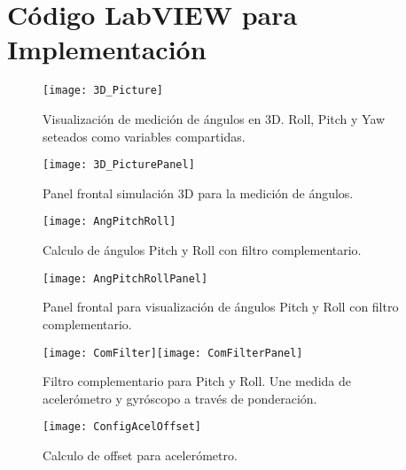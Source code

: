 \documentclass[\main/main.tex]{subfiles}
\begin{document}
\chapter{Código LabVIEW para Implementación}
\begin{landscape}

\begin{figure}
\begin{centering}
\texttt{[image: 3D\_Picture]}
\par\end{centering}
\caption{Visualización de medición de ángulos en 3D. Roll, Pitch y Yaw seteados
como variables compartidas.}
\end{figure}

\begin{figure}
\begin{centering}
\texttt{[image: 3D\_PicturePanel]}
\par\end{centering}
\caption{Panel frontal simulación 3D para la medición de ángulos.}
\end{figure}

\begin{figure}
\begin{centering}
\texttt{[image: AngPitchRoll]}
\par\end{centering}
\caption{Calculo de ángulos Pitch y Roll con filtro complementario.}
\end{figure}

\begin{figure}
\begin{centering}
\texttt{[image: AngPitchRollPanel]}
\par\end{centering}
\caption{Panel frontal para visualización de ángulos Pitch y Roll con filtro
complementario.}
\end{figure}

\begin{figure}
\begin{centering}
\texttt{[image: ComFilter]}\texttt{[image: ComFilterPanel]}
\par\end{centering}
\caption{Filtro complementario para Pitch y Roll. Une medida de acelerómetro
y gyróscopo a través de ponderación.}
\end{figure}

\begin{figure}
\begin{raggedright}
\texttt{[image: ConfigAcelOffset]}
\par\end{raggedright}
\caption{Calculo de offset para acelerómetro.}
\end{figure}


\end{landscape}
\end{document}
